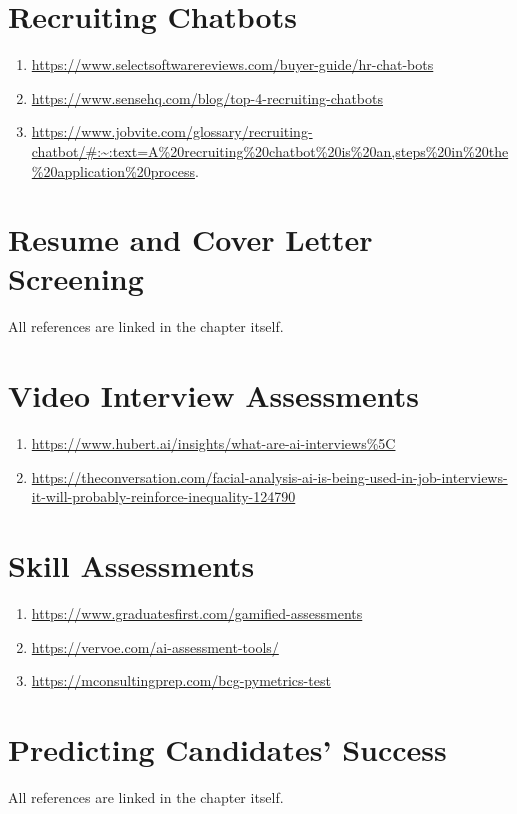\documentclass[
]{book}
\providecommand{\tightlist}{%
  \setlength{\itemsep}{0pt}\setlength{\parskip}{0pt}}
\begin{document}
\hypertarget{recruiting-chatbots-1}{%
\section{Recruiting Chatbots}\label{recruiting-chatbots-1}}

\begin{enumerate}
\def\labelenumi{\arabic{enumi}.}
\item
  \url{https://www.selectsoftwarereviews.com/buyer-guide/hr-chat-bots}
\item
  \url{https://www.sensehq.com/blog/top-4-recruiting-chatbots}
\item
  \url{https://www.jobvite.com/glossary/recruiting-chatbot/\#:~:text=A\%20recruiting\%20chatbot\%20is\%20an,steps\%20in\%20the\%20application\%20process}.
\end{enumerate}

\hypertarget{resume-and-cover-letter-screening-1}{%
\section{Resume and Cover Letter Screening}\label{resume-and-cover-letter-screening-1}}

All references are linked in the chapter itself.

\hypertarget{video-interview-assessments-1}{%
\section{Video Interview Assessments}\label{video-interview-assessments-1}}

\begin{enumerate}
\def\labelenumi{(\arabic{enumi})}
\item
  \url{https://www.hubert.ai/insights/what-are-ai-interviews\%5C}
\item
  \url{https://theconversation.com/facial-analysis-ai-is-being-used-in-job-interviews-it-will-probably-reinforce-inequality-124790}
\end{enumerate}

\hypertarget{skill-assessments-1}{%
\section{Skill Assessments}\label{skill-assessments-1}}

\begin{enumerate}
\def\labelenumi{\arabic{enumi}.}
\tightlist
\item
  \url{https://www.graduatesfirst.com/gamified-assessments}
\item
  \url{https://vervoe.com/ai-assessment-tools/}
\item
  \url{https://mconsultingprep.com/bcg-pymetrics-test}
\end{enumerate}

\hypertarget{predicting-candidates-success-1}{%
\section{Predicting Candidates' Success}\label{predicting-candidates-success-1}}

All references are linked in the chapter itself.

  
\end{document}
